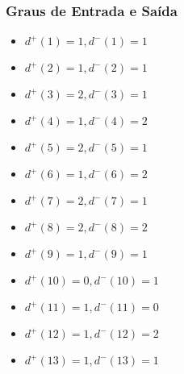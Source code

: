 \documentclass[a4paper,12pt]{article}
\begin{document}
\subsubsection*{Graus de Entrada e Saída}
\begin{multicols}{3}
\begin{itemize}[nosep]
    \item $d^{+}(1)=1, d^{-}(1)=1$
    \item $d^{+}(2)=1, d^{-}(2)=1$
    \item $d^{+}(3)=2, d^{-}(3)=1$
    \item $d^{+}(4)=1, d^{-}(4)=2$
    \item $d^{+}(5)=2, d^{-}(5)=1$
    \item $d^{+}(6)=1, d^{-}(6)=2$
    \item $d^{+}(7)=2, d^{-}(7)=1$
    \item $d^{+}(8)=2, d^{-}(8)=2$
    \item $d^{+}(9)=1, d^{-}(9)=1$
    \item $d^{+}(10)=0, d^{-}(10)=1$
    \item $d^{+}(11)=1, d^{-}(11)=0$
    \item $d^{+}(12)=1, d^{-}(12)=2$
    \item $d^{+}(13)=1, d^{-}(13)=1$
\end{itemize}
\end{multicols}

\end{document}
